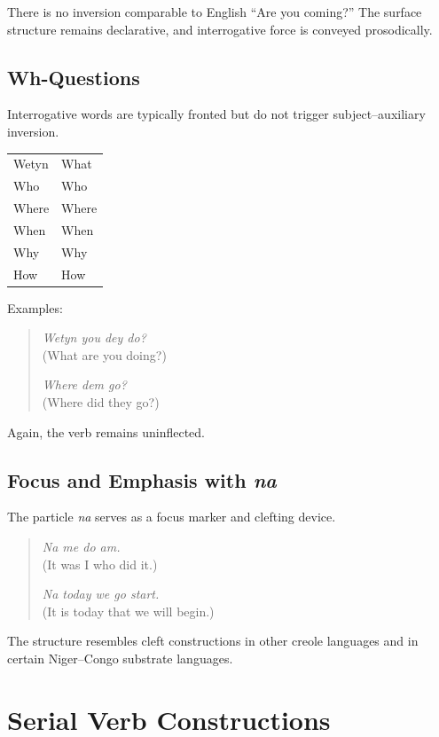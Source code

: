 \documentclass[12pt]{article}
\begin{document}
There is no inversion comparable to English “Are you coming?” The surface structure remains declarative, and interrogative force is conveyed prosodically.

\subsection{Wh-Questions}

Interrogative words are typically fronted but do not trigger subject--auxiliary inversion.

\begin{center}
\begin{tabular}{ll}
Wetyn & What \\
Who & Who \\
Where & Where \\
When & When \\
Why & Why \\
How & How \\
\end{tabular}
\end{center}

Examples:

\begin{quote}
\textit{Wetyn you dey do?} \\
(What are you doing?)

\textit{Where dem go?} \\
(Where did they go?)
\end{quote}

Again, the verb remains uninflected.

\subsection{Focus and Emphasis with \textit{na}}

The particle \textit{na} serves as a focus marker and clefting device.

\begin{quote}
\textit{Na me do am.} \\
(It was I who did it.)

\textit{Na today we go start.} \\
(It is today that we will begin.)
\end{quote}

The structure resembles cleft constructions in other creole languages and in certain Niger--Congo substrate languages.

\section{Serial Verb Constructions}
\end{document}
